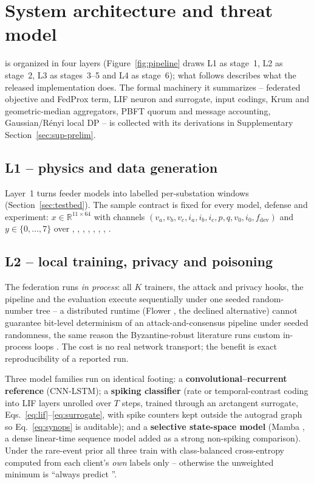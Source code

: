 \section{System architecture and threat model}
\label{sec:arch}

\sysname{} is organized in four layers (Figure~\ref{fig:pipeline} draws L1 as stage~1,
L2 as stage~2, L3 as stages~3--5 and L4 as stage~6); what
follows describes what the released implementation does. The formal
machinery it summarizes -- federated objective and FedProx term, LIF
neuron and surrogate, input codings, Krum and geometric-median
aggregators, PBFT quorum and message accounting, Gaussian/R\'enyi local
DP -- is collected with its derivations in Supplementary
Section~\ref{sec:sup-prelim}.

\subsection{L1 -- physics and data generation}

Layer~1 turns feeder models into labelled per-substation windows
(Section~\ref{sec:testbed}). The sample contract is fixed for every
model, defense and experiment: $x\in\mathbb{R}^{11\times 64}$ with
channels
$(v_a,v_b,v_c,i_a,i_b,i_c,p,q,v_0,i_0,f_{\mathrm{dev}})$ and
$y\in\{0,\dots,7\}$ over , , ,
, , , ,
.

\subsection{L2 -- local training, privacy and poisoning}

The federation runs \emph{in process}: all $K$ trainers, the attack and
privacy hooks, the pipeline and the evaluation execute sequentially
under one seeded random-number tree -- a distributed runtime (Flower
\cite{beutel2020flower}, the declined alternative) cannot guarantee
bit-level determinism of an attack-and-consensus pipeline under seeded
randomness, the same reason the Byzantine-robust literature runs custom
in-process loops \cite{fang2020,cao2021fltrust,shejwalkar2021}. The cost
is no real network transport; the benefit is exact reproducibility of a
reported run.

Three model families run on identical footing: a
\textbf{convolutional--recurrent reference} (CNN-LSTM); a \textbf{spiking
classifier} (rate or temporal-contrast coding into LIF layers unrolled
over $T$ steps, trained through an arctangent surrogate,
Eqs.~\ref{eq:lif}--\ref{eq:surrogate}, with spike counters kept outside
the autograd graph so Eq.~\ref{eq:synops} is auditable); and a
\textbf{selective state-space model} (Mamba \cite{gu2023mamba}, a dense
linear-time sequence model added as a strong non-spiking comparison).
Under the rare-event prior all three train with class-balanced
cross-entropy \cite{cui2019} computed from each client's \emph{own}
labels only -- otherwise the unweighted minimum is ``always predict
''.

